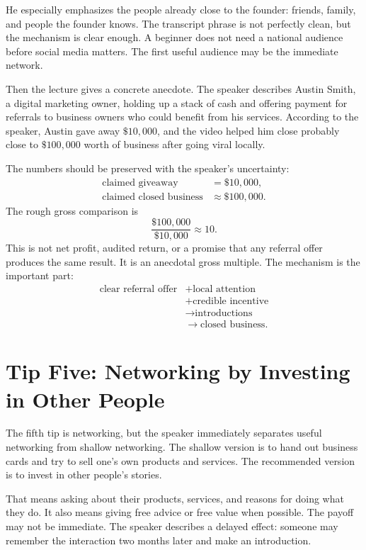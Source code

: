 He especially emphasizes the people already close to the founder: friends, family, and people the founder knows. The transcript phrase is not perfectly clean, but the mechanism is clear enough. A beginner does not need a national audience before social media matters. The first useful audience may be the immediate network.

Then the lecture gives a concrete anecdote. The speaker describes Austin Smith, a digital marketing owner, holding up a stack of cash and offering payment for referrals to business owners who could benefit from his services. According to the speaker, Austin gave away \(\$10{,}000\), and the video helped him close probably close to \(\$100{,}000\) worth of business after going viral locally.

The numbers should be preserved with the speaker's uncertainty:
\[
\begin{aligned}
\text{claimed giveaway} &= \$10{,}000, \\
\text{claimed closed business} &\approx \$100{,}000.
\end{aligned}
\]
The rough gross comparison is
\[
\frac{\$100{,}000}{\$10{,}000}\approx 10.
\]
This is not net profit, audited return, or a promise that any referral offer produces the same result. It is an anecdotal gross multiple. The mechanism is the important part:
\[
\begin{aligned}
\text{clear referral offer}
&+ \text{local attention} \\
&+ \text{credible incentive} \\
&\longrightarrow \text{introductions} \\
&\longrightarrow \text{closed business}.
\end{aligned}
\]

\section{Tip Five: Networking by Investing in Other People}

The fifth tip is networking, but the speaker immediately separates useful networking from shallow networking. The shallow version is to hand out business cards and try to sell one's own products and services. The recommended version is to invest in other people's stories.

That means asking about their products, services, and reasons for doing what they do. It also means giving free advice or free value when possible. The payoff may not be immediate. The speaker describes a delayed effect: someone may remember the interaction two months later and make an introduction.

